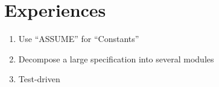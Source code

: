 \chapter{Experiences}	\label{chapter:experience}

\begin{enumerate}
  \item Use ``ASSUME'' for ``Constants''
  \item Decompose a large specification into several modules
  \item Test-driven
\end{enumerate}
